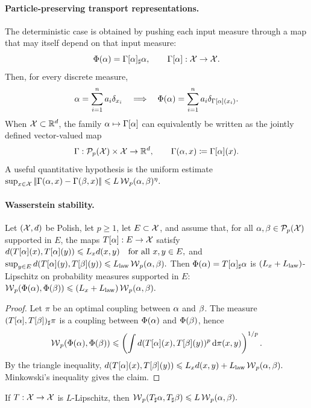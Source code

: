 \paragraph{Particle-preserving transport representations.}
The deterministic case is obtained by pushing each input measure through a map that may itself depend on that input measure:
\begin{equation}\label{eq-measure-map-transport-representation}
\Phi(\alpha) = \Gamma[\alpha]_\sharp \alpha,
\qquad
\Gamma[\alpha]: \mathcal{X} \to \mathcal{X}.
\end{equation}
Then, for every discrete measure,
\begin{equation}\label{eq-measure-map-preserve-atoms}
\alpha=\sum_{i=1}^n a_i\delta_{x_i}
\quad\Longrightarrow\quad
\Phi(\alpha)=\sum_{i=1}^n a_i\delta_{\Gamma[\alpha](x_i)}.
\end{equation}
When \(\mathcal{X}\subset\mathbb{R}^d\), the family \(\alpha\mapsto\Gamma[\alpha]\) can equivalently be written as the jointly defined vector-valued map
\begin{equation}\label{eq-curried-transport-representative}
\Gamma:\mathcal{P}_p(\mathcal{X})\times\mathcal{X}\to\mathbb{R}^d,
\qquad
\Gamma(\alpha,x)\coloneqq\Gamma[\alpha](x).
\end{equation}
A useful quantitative hypothesis is the uniform estimate
\(\sup_{x\in\mathcal{X}} |\!| \Gamma(\alpha,x)-\Gamma(\beta,x) |\!| \leqslant L\operatorname{\mathcal{W}}_p(\alpha,\beta)^\eta.\)
\paragraph{Wasserstein stability.}
\begin{prop}\label{prop-measure-map-wass-lipschitz}
Let $(\mathcal{X},d)$ be Polish, let $p\geq1$, let $E\subset\mathcal{X}$, and assume that, for all $\alpha,\beta\in\mathcal{P}_p(\mathcal{X})$ supported in $E$, the maps $T[\alpha]:E\to\mathcal{X}$ satisfy
\(d(T[\alpha](x),T[\alpha](y)) \leqslant L_x d(x,y) \quad\text{for all }x,y\in E,\)
and
\(\sup_{y\in E} d(T[\alpha](y),T[\beta](y)) \leqslant L_{\rm law} \operatorname{\mathcal{W}}_p(\alpha,\beta).\)
Then $\Phi(\alpha)=T[\alpha]_\sharp\alpha$ is $(L_x+L_{\rm law})$-Lipschitz on probability measures supported in $E$: \(\operatorname{\mathcal{W}}_p(\Phi(\alpha),\Phi(\beta)) \leqslant (L_x+L_{\rm law})\operatorname{\mathcal{W}}_p(\alpha,\beta).\)
\end{prop}
\begin{proof}
Let $\pi$ be an optimal coupling between $\alpha$ and $\beta$. The measure $(T[\alpha],T[\beta])_\sharp\pi$ is a coupling between $\Phi(\alpha)$ and $\Phi(\beta)$, hence
\[
\operatorname{\mathcal{W}}_p(\Phi(\alpha),\Phi(\beta))
\leqslant
\left(
\int d(T[\alpha](x),T[\beta](y))^p\,\mathrm{d}\pi(x,y)
\right)^{1/p}.
\]
By the triangle inequality, \(d(T[\alpha](x),T[\beta](y)) \leqslant L_x d(x,y)+L_{\rm law}\operatorname{\mathcal{W}}_p(\alpha,\beta).\)
Minkowski's inequality gives the claim.
\end{proof}
If $T:\mathcal{X}\to\mathcal{X}$ is $L$-Lipschitz, then
\(\operatorname{\mathcal{W}}_p(T_\sharp\alpha,T_\sharp\beta)\leqslant L\operatorname{\mathcal{W}}_p(\alpha,\beta).\)
